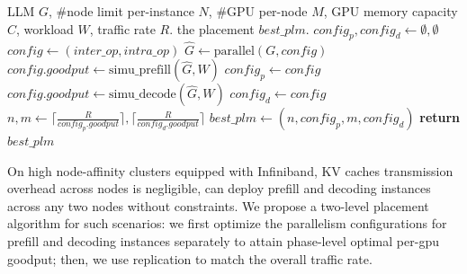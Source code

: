 \begin{algorithm}[t!]
\caption{High Node-Affinity Placement Algorithm}\label{alg:optimal-placement}
\begin{algorithmic}
\Require LLM $G$, \#node limit per-instance $N$, \#GPU per-node $M$, GPU memory capacity $C$, workload $W$, traffic rate $R$.
\Ensure the placement $\mathit{best\_plm}.$ 
    \State $\mathit{config_p}, \mathit{config_d} \leftarrow \emptyset, \emptyset$
                \State $\mathit{config} \leftarrow (\mathit{inter\_op}, \mathit{intra\_op})$
                \State $\hat{G} \leftarrow \text{parallel}(G, \mathit{config})$
                \State $\mathit{config.goodput} \leftarrow \text{simu\_prefill}(\hat{G}, W)$
                    \State $\mathit{config_p} \leftarrow \mathit{config}$
                \EndIf
                \State $\mathit{config.goodput} \leftarrow \text{simu\_decode}(\hat{G}, W)$
                    \State $\mathit{config_d} \leftarrow \mathit{config}$
                \EndIf
            \EndIf
        \EndFor
    \EndFor
    \State $n, m \leftarrow \lceil \frac{R}{\mathit{config_p.goodput}} \rceil, \lceil \frac{R}{\mathit{config_d.goodput}} \rceil$ 
    \State $\mathit{best\_plm} \leftarrow (n, \mathit{config_p}, m, \mathit{config_d})$
\State \textbf{return} $\mathit{best\_plm}$
\end{algorithmic}
\end{algorithm}

On high node-affinity clusters equipped with Infiniband, KV caches transmission overhead across nodes is negligible, \sys can deploy prefill and decoding instances across any two nodes without constraints. 
We propose a two-level placement algorithm for such scenarios:  we first optimize the parallelism configurations for prefill and decoding instances separately to attain phase-level optimal per-gpu goodput; then, we use replication to match the overall traffic rate.


